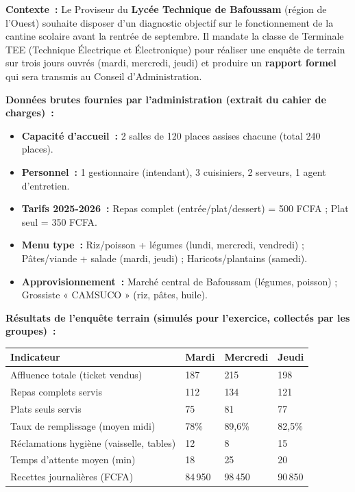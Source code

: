 \documentclass[11pt]{article}
\newcounter{popsec}
\newcounter{popsub}
\newcommand{\courssub}[1]{%
  \stepcounter{popsub}%
  \par\vspace{9pt}\noindent{\popxbold\fontsize{11.5}{13}\selectfont\color{popink}{\color{poporange}\thepopsec.\thepopsub}\hspace{6pt}#1}\par\nopagebreak\vspace{4pt}
}
\begin{document}
\courssub{Situation}
\noindent \textbf{Contexte~:} Le Proviseur du \textbf{Lycée Technique de Bafoussam} (région de l'Ouest) souhaite disposer d'un diagnostic objectif sur le fonctionnement de la cantine scolaire avant la rentrée de septembre. Il mandate la classe de Terminale TEE (Technique Électrique et Électronique) pour réaliser une enquête de terrain sur trois jours ouvrés (mardi, mercredi, jeudi) et produire un \textbf{rapport formel} qui sera transmis au Conseil d'Administration.

\noindent \textbf{Données brutes fournies par l'administration (extrait du cahier de charges)~:}
\begin{itemize}
    \item \textbf{Capacité d'accueil~:} 2 salles de 120 places assises chacune (total 240 places).
    \item \textbf{Personnel~:} 1 gestionnaire (intendant), 3 cuisiniers, 2 serveurs, 1 agent d'entretien.
    \item \textbf{Tarifs 2025-2026~:} Repas complet (entrée/plat/dessert) = 500 FCFA ; Plat seul = 350 FCFA.
    \item \textbf{Menu type~:} Riz/poisson + légumes (lundi, mercredi, vendredi) ; Pâtes/viande + salade (mardi, jeudi) ; Haricots/plantains (samedi).
    \item \textbf{Approvisionnement~:} Marché central de Bafoussam (légumes, poisson) ; Grossiste « CAMSUCO » (riz, pâtes, huile).
\end{itemize}

\noindent \textbf{Résultats de l'enquête terrain (simulés pour l'exercice, collectés par les groupes)~:}

\begin{center}
\begin{tabularx}{\linewidth}{|l|X|X|X|}\hline
\textbf{Indicateur} & \textbf{Mardi} & \textbf{Mercredi} & \textbf{Jeudi} \\ \hline
Affluence totale (ticket vendus) & 187 & 215 & 198 \\ \hline
Repas complets servis & 112 & 134 & 121 \\ \hline
Plats seuls servis & 75 & 81 & 77 \\ \hline
Taux de remplissage (moyen midi) & 78\% & 89,6\% & 82,5\% \\ \hline
Réclamations hygiène (vaisselle, tables) & 12 & 8 & 15 \\ \hline
Temps d'attente moyen (min) & 18 & 25 & 20 \\ \hline
Recettes journalières (FCFA) & 84\,950 & 98\,450 & 90\,850 \\ \hline
\end{tabularx}
\end{center}
\end{document}
